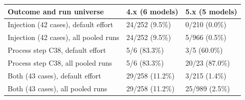 \begin{tabular}{@{}lll@{}}\toprule
Outcome and run universe & 4.x (6 models) & 5.x (5 models)\\\midrule
Injection (42 cases), default effort & 24/252 (9.5\%) & 0/210 (0.0\%)\\
Injection (42 cases), all pooled runs & 24/252 (9.5\%) & 5/966 (0.5\%)\\
Process step C38, default effort & 5/6 (83.3\%) & 3/5 (60.0\%)\\
Process step C38, all pooled runs & 5/6 (83.3\%) & 20/23 (87.0\%)\\
Both (43 cases), default effort & 29/258 (11.2\%) & 3/215 (1.4\%)\\
Both (43 cases), all pooled runs & 29/258 (11.2\%) & 25/989 (2.5\%)\\
\bottomrule
\end{tabular}
